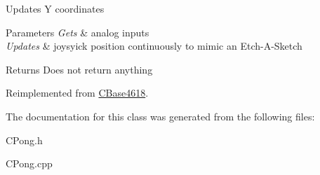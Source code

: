 Updates Y coordinates


\begin{DoxyParams}{Parameters}
{\em Gets} & analog inputs \\
\hline
{\em Updates} & joysyick position continuously to mimic an Etch-\/\+A-\/\+Sketch\\
\hline
\end{DoxyParams}
\begin{DoxyReturn}{Returns}
Does not return anything 
\end{DoxyReturn}


Reimplemented from \hyperlink{class_c_base4618_a46e2ad109d3c7c877d00cff9093736c7}{C\+Base4618}.



The documentation for this class was generated from the following files\+:\begin{DoxyCompactItemize}
\item 
C\+Pong.\+h\item 
C\+Pong.\+cpp\end{DoxyCompactItemize}
